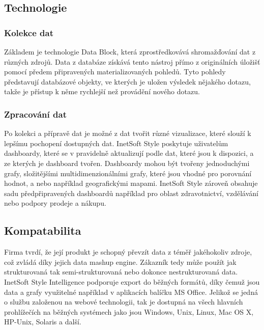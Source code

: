\documentclass[czech,BP]{thesiskiv}
\begin{document}
\subsection{Technologie}
\subsubsection{Kolekce dat}
Základem je technologie Data Block\texttrademark, která zprostředkovává shromažďování dat z různých zdrojů. Data z databáze získává tento nástroj přímo z originálních úložišť pomocí předem připravených materializovaných pohledů. Tyto pohledy představují databázové objekty, ve kterých je uložen výsledek nějakého dotazu, takže je přístup k něme rychlejší než provádění nového dotazu.
\subsubsection{Zpracování dat}
Po kolekci a přípravě dat je možné z dat tvořit různé vizualizace, které slouží k lepšímu pochopení dostupných dat. InetSoft Style poskytuje uživatelům dashboardy, které se v pravidelně aktualizují podle dat, které jsou k dispozici, a ze kterých je dashboard tvořen. Dashboardy mohou být tvořeny jednoduchými grafy, složitějšími multidimenzionálními grafy, které jsou vhodné pro porovnání hodnot, a nebo například geografickými mapami. InetSoft Style zároveň obsahuje sadu předpřipravených dashboardů například pro oblast zdravotnictví, vzdělávání nebo podpory prodeje a nákupu. 


\subsection{Kompatabilita}
Firma tvrdí, že její produkt je schopný převzít data z téměř jakéhokoliv zdroje, což zvládá díky jejich data mashup engine. Zákazník tedy může použít jak strukturovaná tak semi-strukturovaná nebo dokonce nestrukturovaná data. InetSoft Style Intelligence podporuje export do běžných formátů, díky čemuž jsou data a grafy využitelné například v aplikacích balíčku MS Office. Jelikož se jedná o službu založenou na webové technologii, tak je dostupná na všech hlavních prohlížečích na běžných systémech jako jsou Windows, Unix, Linux, Mac OS X, HP-Unix, Solaris a další.\cite{InetKompatilbilita}
\end{document}
